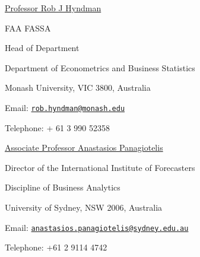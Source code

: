 \documentclass[10pt,a4paper,]{article}
\begin{document}
\href{https://robjhyndman.com/}{Professor Rob J Hyndman}

FAA FASSA

Head of Department

Department of Econometrics and Business Statistics

Monash University, VIC 3800, Australia

Email:
\href{mailto:rob.hyndman@monash.edu}{\nolinkurl{rob.hyndman@monash.edu}}

Telephone: + 61 3 990 52358

\bigskip

\href{https://anastasiospanagiotelis.netlify.app/}{Associate Professor Anastasios Panagiotelis}

Director of the International Institute of Forecasters

Discipline of Business Analytics

University of Sydney, NSW 2006, Australia

Email:
\href{mailto:anastasios.panagiotelis@sydney.edu.au}{\nolinkurl{anastasios.panagiotelis@sydney.edu.au}}

Telephone: +61 2 9114 4742
\end{document}
